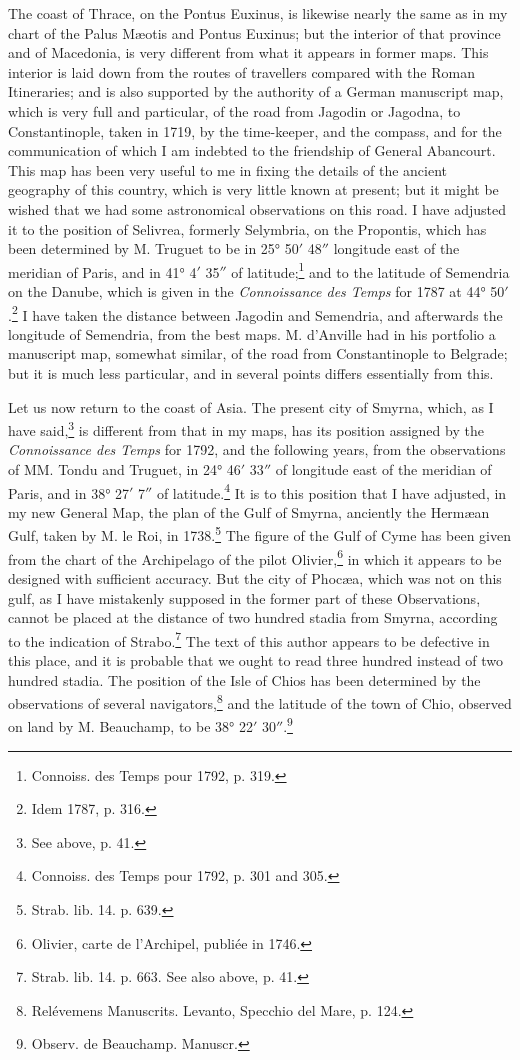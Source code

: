 \documentclass[a4paper, 11pt, oneside, polutonikogreek, english]{article}
\begin{document}
The coast of Thrace, on the Pontus Euxinus, is likewise nearly the same as in my chart of the Palus Mæotis and Pontus Euxinus; but the interior of that province and of Macedonia, is very different from what it appears in former maps. This interior is laid down from the routes of travellers compared with the Roman Itineraries; and is also supported by the authority of a German manuscript map, which is very full and particular, of the road from Jagodin or Jagodna, to Constantinople, taken in 1719, by the time-keeper, and the compass, and for the communication of which I am indebted to the friendship of General Abancourt. This map has been very useful to me in fixing the details of the ancient geography of this country, which is very little known at present; but it might be wished that we had some astronomical observations on this road. I have adjusted it to the position of Selivrea, formerly Selymbria, on the Propontis, which has been determined by M. Truguet to be in 25° 50$'$ 48$''$ longitude east of the meridian of Paris, and in 41° 4$'$ 35$''$ of latitude;\footnote{Connoiss. des Temps pour 1792, p. 319.} and to the latitude of Semendria on the Danube, which is given in the \emph{Connoissance des Temps} for 1787 at 44° 50$'$.\footnote{Idem 1787, p. 316.} I have taken the distance between Jagodin and Semendria, and afterwards the longitude of Semendria, from the best maps. M. d'Anville had in his portfolio a manuscript map, somewhat similar, of the road from Constantinople to Belgrade; but it is much less particular, and in several points differs essentially from this.

Let us now return to the coast of Asia. The present city of Smyrna, which, as I have said,\footnote{See above, p. 41.} is different from that in my maps, has its position assigned by the \emph{Connoissance des Temps} for 1792, and the following years, from the observations of MM. Tondu and Truguet, in 24° 46$'$ 33$''$ of longitude east of the meridian of Paris, and in 38° 27$'$ 7$''$ of latitude.\footnote{Connoiss. des Temps pour 1792, p. 301 and 305.} It is to this position that I have adjusted, in my new General Map, the plan of the Gulf of Smyrna, anciently the Hermæan Gulf, taken by M. le Roi, in 1738.\footnote{Strab. lib. 14. p. 639.} The figure of the Gulf of Cyme has been given from the chart of the Archipelago of the pilot Olivier,\footnote{Olivier, carte de l'Archipel, publiée in 1746.} in which it appears to be designed with sufficient accuracy. But the city of Phocæa, which was not on this gulf, as I have mistakenly supposed in the former part of these Observations, cannot be placed at the distance of two hundred stadia from Smyrna, according to the indication of Strabo.\footnote{Strab. lib. 14. p. 663. See also above, p. 41.} The text of this author appears to be defective in this place, and it is probable that we ought to read three hundred instead of two hundred stadia. The position of the Isle of Chios has been determined by the observations of several navigators,\footnote{Relévemens Manuscrits. Levanto, Specchio del Mare, p. 124.} and the latitude of the town of Chio, observed on land by M. Beauchamp, to be 38° 22$'$ 30$''$.\footnote{Observ. de Beauchamp. Manuscr.}
\end{document}
